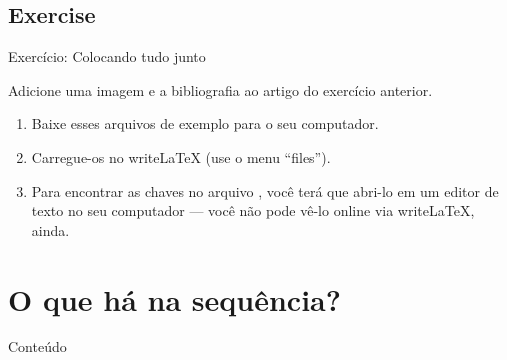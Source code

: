 \documentclass{beamer}
\begin{document}
\subsection{Exercise}
\begin{frame}[fragile]{Exercício: Colocando tudo junto}

Adicione uma imagem e a bibliografia ao artigo do exercício anterior.


\begin{enumerate}
\item Baixe esses arquivos de exemplo para o seu computador.

\begin{center}

\end{center}

\item Carregue-os no writeLaTeX (use o menu ``files'').

\item Para encontrar as chaves no arquivo , você terá que abri-lo em um editor de texto no seu computador --- você não pode vê-lo online via writeLaTeX, ainda.

\end{enumerate}
\end{frame}

\section{O que há na sequência?}

\begin{frame}{Conteúdo}
\begin{multicols}{2}
	\tableofcontents[currentsection]
\end{multicols}
\end{frame}
\end{document}
